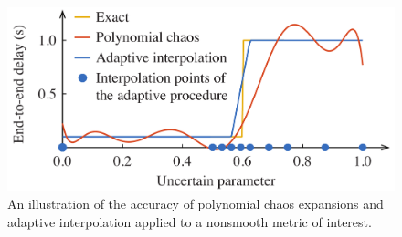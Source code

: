 \begin{figure}
  \centering
  \includegraphics[width=0.9\columnwidth]{include/assets/figures/motivation.pdf}
  \vspace{-0.5em}
  \caption{
    An illustration of the accuracy of polynomial chaos expansions and adaptive
    interpolation applied to a nonsmooth metric of interest.
  }
\end{figure}
